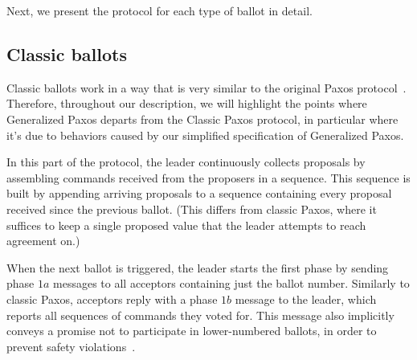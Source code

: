 Next, we present the protocol for each type of ballot in detail.

\subsection{Classic ballots} 

Classic ballots work in a way that is very similar to the original Paxos protocol~\cite{Lam98}. Therefore, throughout our description, we will highlight the points where Generalized Paxos departs from the Classic Paxos protocol, in particular where it's due to behaviors caused by our simplified specification of Generalized Paxos.\par
In this part of the protocol, the leader continuously collects proposals by assembling commands received from the proposers in a sequence. This sequence is built by appending arriving proposals to a sequence containing every proposal received since the previous ballot. (This differs from classic Paxos, where it suffices to keep a single proposed value that the leader attempts to reach agreement on.)\par
When the next ballot is triggered, the leader starts the first phase by sending phase $1a$ messages to all acceptors containing just the ballot number. Similarly to classic Paxos, acceptors reply with a phase $1b$ message to the leader, which reports all sequences of commands they voted for. This message also implicitly conveys a promise not to participate in lower-numbered ballots, in order to prevent safety violations~\cite{Lam98}.

